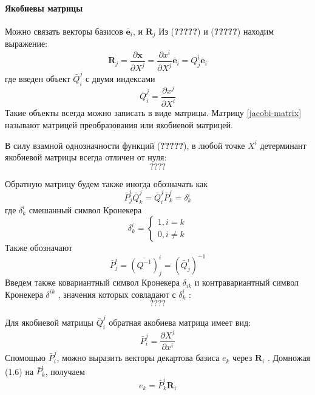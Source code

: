\paragraph {Якобиевы матрицы}
Можно связать векторы базисов $\bar{\textbf{e}}_i$, и $\textbf{R}_j$  Из (\textbf{?????}) и (\textbf{?????}) находим выражение:
\begin{equation*}
    \textbf{R}_j = \frac{\partial\textbf{x}}{\partial X^j} = \frac{\partial x^i}{\partial X^j} \bar{\textbf{e}}_i = Q^i_j \bar{\textbf{e}}_i
\end{equation*}
где введен объект $\bar{Q}^j_i$ с двумя индексами
\begin{equation}\label{jacobi-matrix}
    \bar{Q}^j_i= \frac{\partial x^j}{\partial X^i}
\end{equation}
Такие объекты всегда можно записать в виде матрицы. Матрицу \eqref{jacobi-matrix} называют матрицей преобразования или якобиевой матрицей.

В силу взамной однозначности функций (\textbf{?????}), в любой точке $X^i$ детерминант якобиевой матрицы всегда отличен от нуля:
\begin{equation*}
	\textbf{????}
\end{equation*}

Обратную матрицу будем также иногда обозначать как 
\begin{equation*}
    \bar{P}^i_j\bar{Q}^j_k = \bar{Q}^j_i\bar{P}^j_k  = \delta^i_k
\end{equation*}
где $\delta^i_k$ смешанный символ Кронекера
\begin{equation*}
    \delta^i_k = \begin{cases}
    1, i = k\\
    0, i \ne k
    \end{cases}
\end{equation*}
Также обозначают
\begin{equation*}
    \bar{P}^i_j= (\bar{Q^{-1}})^i_j   = (\bar{Q}^i_j)^{-1} 
\end{equation*}
Введем также ковариантный символ Кронекера $\delta_{ik}$  и контравариантный символ Кронекера $\delta^{ik}$ , значения которых совладают с $\delta^i_k$ :
\begin{equation*}
	\textbf{????}
\end{equation*}

Для якобиевой матрицы $\bar{Q}^j_i$ обратная акобиева матрица имеет вид:
\begin{equation*}
    \bar{P}^j_i= \frac{\partial X^j}{\partial x^i}
\end{equation*}
Спомощью $\bar{P}^j_i$, можно выразить векторы декартова базиса $e_k$ через $\textbf{R}_i$ . Домножая (1.6) на $\bar{P}^i_k$, получаем
\begin{equation*}
    e_k = \bar{P}^i_k \textbf{R}_i
\end{equation*}
